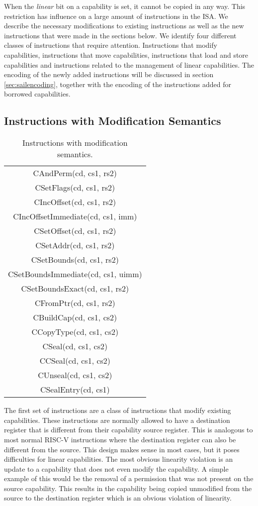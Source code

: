 When the \textit{linear} bit on a capability is set, it cannot be copied in any way. This restriction has influence on a large amount of instructions in the ISA. We describe the necessary modifications to existing instructions as well as the new instructions that were made in the sections below. We identify four different classes of instructions that require attention. Instructions that modify capabilities, instructions that move capabilities, instructions that load and store capabilities and instructions related to the management of linear capabilities. The encoding of the newly added instructions will be discussed in section \ref{sec:sailencoding}, together with the encoding of the instructions added for borrowed capabilities.

\subsection{Instructions with Modification Semantics}
\begin{table}[h]
\centering
\begin{tabular}{| c |}
\hline
 CAndPerm(cd, cs1, rs2) \\
 CSetFlags(cd, cs1, rs2) \\
 CIncOffset(cd, cs1, rs2) \\
 CIncOffsetImmediate(cd, cs1, imm) \\
 CSetOffset(cd, cs1, rs2) \\
 CSetAddr(cd, cs1, rs2) \\
 CSetBounds(cd, cs1, rs2) \\
 CSetBoundsImmediate(cd, cs1, uimm) \\
 CSetBoundsExact(cd, cs1, rs2) \\
 CFromPtr(cd, cs1, rs2) \\
 CBuildCap(cd, cs1, cs2) \\
 CCopyType(cd, cs1, cs2) \\
 CSeal(cd, cs1, cs2) \\
 CCSeal(cd, cs1, cs2) \\
 CUnseal(cd, cs1, cs2) \\
 CSealEntry(cd, cs1) \\
\hline
\end{tabular}
\caption{Instructions with modification semantics.}
\label{table:lininstmod}
\end{table}
The first set of instructions are a class of instructions that modify existing capabilities. These instructions are normally allowed to have a destination register that is different from their capability source register. This is analogous to most normal RISC-V instructions where the destination register can also be different from the source. This design makes sense in most cases, but it poses difficulties for linear capabilities. The most obvious linearity violation is an update to a capability that does not even modify the capability. A simple example of this would be the removal of a permission that was not present on the source capability. This results in the capability being copied unmodified from the source to the destination register which is an obvious violation of linearity.
